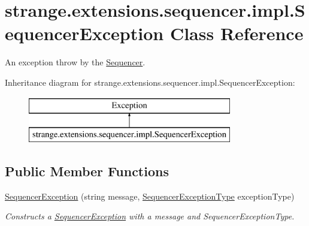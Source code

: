 \hypertarget{classstrange_1_1extensions_1_1sequencer_1_1impl_1_1_sequencer_exception}{\section{strange.\-extensions.\-sequencer.\-impl.\-Sequencer\-Exception Class Reference}
\label{classstrange_1_1extensions_1_1sequencer_1_1impl_1_1_sequencer_exception}
}


An exception throw by the \hyperlink{classstrange_1_1extensions_1_1sequencer_1_1impl_1_1_sequencer}{Sequencer}.  


Inheritance diagram for strange.\-extensions.\-sequencer.\-impl.\-Sequencer\-Exception\-:\begin{figure}[H]
\begin{center}
\leavevmode
\includegraphics[height=2.000000cm]{classstrange_1_1extensions_1_1sequencer_1_1impl_1_1_sequencer_exception}
\end{center}
\end{figure}
\subsection*{Public Member Functions}
\begin{DoxyCompactItemize}
\item 
\hypertarget{classstrange_1_1extensions_1_1sequencer_1_1impl_1_1_sequencer_exception_a6d49942050ce35afe047465a2782627f}{\hyperlink{classstrange_1_1extensions_1_1sequencer_1_1impl_1_1_sequencer_exception_a6d49942050ce35afe047465a2782627f}{Sequencer\-Exception} (string message, \hyperlink{namespacestrange_1_1extensions_1_1sequencer_1_1api_aeddaacdea22f90d94ab298d24cbce41b}{Sequencer\-Exception\-Type} exception\-Type)}\label{classstrange_1_1extensions_1_1sequencer_1_1impl_1_1_sequencer_exception_a6d49942050ce35afe047465a2782627f}

\begin{DoxyCompactList}\small\item\em Constructs a \hyperlink{classstrange_1_1extensions_1_1sequencer_1_1impl_1_1_sequencer_exception}{Sequencer\-Exception} with a message and Sequencer\-Exception\-Type. \end{DoxyCompactList}\end{DoxyCompactItemize}
